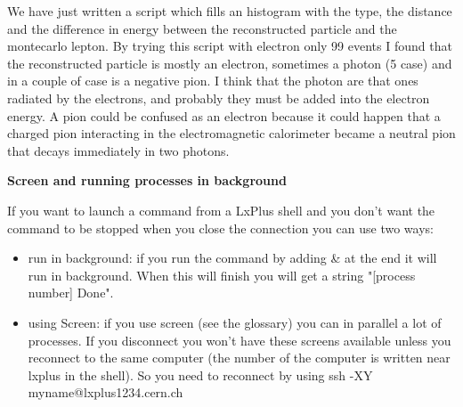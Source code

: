 We have just written a script which fills an histogram with the type, the distance and the difference in energy between the reconstructed particle and the montecarlo lepton.
By trying this script with electron only 99 events I found that the reconstructed particle is mostly an electron, sometimes a photon (5 case) and in a couple of case is a negative pion. I think that the photon are that ones radiated by the electrons, and probably they must be added into the electron energy. A pion could be confused as an electron because it could happen that a charged pion interacting in the electromagnetic calorimeter became a neutral pion that decays immediately in two photons.

\textbf{Screen and running processes in background}

If you want to launch a command from a LxPlus shell and you don't want the command to be stopped when you close the connection you can use two ways:

\begin{itemize}
\item run in background: if you run the command by adding \& at the end it will run in background. When this will finish you will get a string "[process number] Done".
\item using Screen: if you use screen (see the glossary) you can in parallel a lot of processes. If you disconnect you won't have these screens available unless you reconnect to the same computer (the number of the computer is written near lxplus in the shell). So you need to reconnect by using ssh -XY myname@lxplus1234.cern.ch 
\end{itemize}